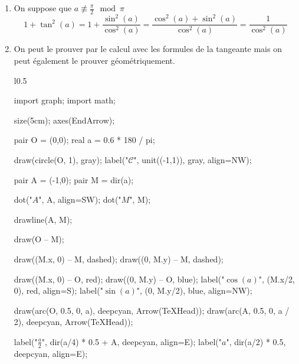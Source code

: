 \begin{prv}
	\begin{enumerate}
		\item On suppose que $a\not\equiv \frac{\pi}{2}\mod\pi$\\
			\[
				1+\tan^2(a) = 1+\frac{\sin^2(a)}{\cos^2(a)} = \frac{\cos^2(a) + \sin^2(a)}{\cos^2(a)} = \frac{1}{\cos^2(a)}
			\]
		\item 
			On peut le prouver par le calcul avec les formules de la tangeante mais on peut également le prouver géométriquement.\\
			\begin{minipage}
				{\linewidth}
				\begin{wrapfigure}{l}{0.5\linewidth}
					\begin{asy}
						import graph;
						import math;

						size(5cm);
						axes(EndArrow);

						pair O = (0,0);
						real a = 0.6 * 180 / pi;

						draw(circle(O, 1), gray);
						label("$\mathcal{C}$", unit((-1,1)), gray, align=NW);

						pair A = (-1,0);
						pair M = dir(a);

						dot("$A$", A, align=SW);
						dot("$M$", M);

						drawline(A, M);
						
						draw(O -- M);

						draw((M.x, 0) -- M, dashed);
						draw((0, M.y) -- M, dashed);

						draw((M.x, 0) -- O, red);
						draw((0, M.y) -- O, blue);
						label("$\cos(a)$", (M.x/2, 0), red, align=S);
						label("$\sin(a)$", (0, M.y/2), blue, align=NW);
						
						draw(arc(O, 0.5, 0, a), deepcyan, Arrow(TeXHead));
						draw(arc(A, 0.5, 0, a / 2), deepcyan, Arrow(TeXHead));

						label("$\frac{a}{2}$", dir(a/4) * 0.5 + A, deepcyan, align=E);
						label("$a$", dir(a/2) * 0.5, deepcyan, align=E);


\end{asy}
\end{wrapfigure}
\end{minipage}
\end{enumerate}
\end{prv}
